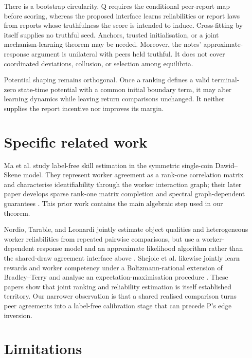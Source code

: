 \documentclass{article}
\begin{document}
There is a bootstrap circularity.  Q requires the conditional peer-report map before scoring, whereas the proposed interface learns reliabilities or report laws from reports whose truthfulness the score is intended to induce.  Cross-fitting by itself supplies no truthful seed.  Anchors, trusted initialisation, or a joint mechanism-learning theorem may be needed. %
Moreover, the notes' approximate-response argument is unilateral with peers held truthful.  It does not cover coordinated deviations, collusion, or selection among equilibria. %

Potential shaping remains orthogonal.  Once a ranking defines a valid terminal-zero state-time potential with a common initial boundary term, it may alter learning dynamics while leaving return comparisons unchanged.  It neither supplies the report incentive nor improves its margin. %

\section{Specific related work}

Ma et al. study label-free skill estimation in the symmetric single-coin Dawid--Skene model.  They represent worker agreement as a rank-one correlation matrix and characterise identifiability through the worker interaction graph; their later paper develops sparse rank-one matrix completion and spectral graph-dependent guarantees \cite{ma2017crowdsourcing,ma2019gradient}.  This prior work contains the main algebraic step used in our theorem. %

Nordio, Tarable, and Leonardi jointly estimate object qualities and heterogeneous worker reliabilities from repeated pairwise comparisons, but use a worker-dependent response model and an approximate likelihood algorithm rather than the shared-draw agreement interface above \cite{nordio2023quite}.  Shejole et al. likewise jointly learn rewards and worker competency under a Boltzmann-rational extension of Bradley--Terry and analyse an expectation-maximisation procedure \cite{shejole2026signal}.  These papers show that joint ranking and reliability estimation is itself established territory.  Our narrower observation is that a shared realised comparison turns peer agreements into a label-free calibration stage that can precede P's edge inversion. %

\section{Limitations}
\end{document}
